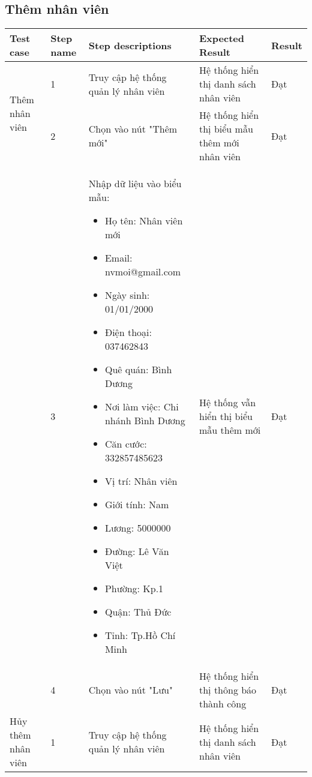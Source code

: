 \subsection{Thêm nhân viên}
{
    \setlength\extrarowheight{6pt}
    \begin{longtable}{| p{2.5cm}| p{1cm}| p{5.5cm}| p{4.5cm} | p{1.5cm} |}
        \hline
        \textbf{Test case} & \textbf{Step name} & \textbf{Step descriptions} & \textbf{Expected Result} & \textbf{Result} \\
        \hline
        \multirow[t]{2}{2.5cm}{Thêm nhân viên} & 1 & Truy cập hệ thống quản lý nhân viên & Hệ thống hiển thị danh sách nhân viên & Đạt \\
        \cline{2-5}
         & 2 & Chọn vào nút "Thêm mới" & Hệ thống hiển thị biểu mẫu thêm mới nhân viên & Đạt \\
        \cline{2-5}
        & 3 & Nhập dữ liệu vào biểu mẫu:
        \begin{itemize}
            \item Họ tên: Nhân viên mới
            \item Email: nvmoi@gmail.com
            \item Ngày sinh: 01/01/2000
            \item Điện thoại: 037462843
            \item Quê quán: Bình Dương
            \item Nơi làm việc: Chi nhánh Bình Dương
            \item Căn cước: 332857485623
            \item Vị trí: Nhân viên
            \item Giới tính: Nam
            \item Lương: 5000000
            \item Đường: Lê Văn Việt
            \item Phường: Kp.1
            \item Quận: Thủ Đức 
            \item Tỉnh: Tp.Hồ Chí Minh
        \end{itemize} & Hệ thống vẫn hiển thị biểu mẫu thêm mới & Đạt \\
        \cline{2-5}
         & 4 & Chọn vào nút "Lưu" & Hệ thống hiển thị thông báo thành công & Đạt \\
        \hline
        \multirow[t]{2}{2.5cm}{Hủy thêm nhân viên} & 1 & Truy cập hệ thống quản lý nhân viên & Hệ thống hiển thị danh sách nhân viên & Đạt \\

\end{longtable}}
